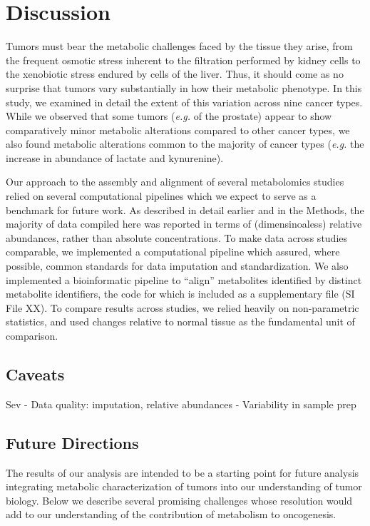 \documentclass[10pt]{article}
\begin{document}
\section{Discussion}

Tumors must bear the metabolic challenges faced by the tissue they arise, from the frequent osmotic stress inherent to the filtration performed by kidney cells to the xenobiotic stress endured by cells of the liver. Thus, it should come as no surprise that tumors  vary substantially in how their metabolic phenotype. In this study, we examined in detail the extent of this variation across nine cancer types. While we observed that some tumors (\textit{e.g.} of the prostate) appear to show comparatively minor metabolic alterations compared to other cancer types, we also found metabolic alterations common to the majority of cancer types (\textit{e.g.} the increase in abundance of lactate and kynurenine). 

Our approach to the assembly and alignment of several metabolomics studies relied on several computational pipelines which we expect to serve as a benchmark for future work. As described in detail earlier and in the Methods, the majority of data compiled here was reported in terms of (dimensinoaless) relative abundances, rather than absolute concentrations. To make data across studies comparable, we implemented a computational pipeline which assured, where possible, common standards for data imputation and standardization. We also implemented a bioinformatic pipeline to ``align'' metabolites identified by distinct metabolite identifiers, the code for which is included as a supplementary file (SI File XX). To compare results across studies, we relied heavily on non-parametric statistics, and used changes relative to normal tissue as the fundamental unit of comparison. 

\subsection{Caveats}
Sev
- Data quality: imputation, relative abundances
- Variability in sample prep


\subsection{Future Directions}
The results of our analysis are intended to be a starting point for future analysis integrating metabolic characterization of tumors into our understanding of tumor biology. Below we describe several promising challenges whose resolution would add to our understanding of the contribution of metabolism to oncogenesis.
\end{document}
